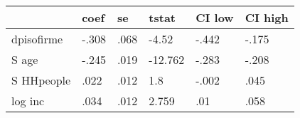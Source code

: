 \begin{table}[htbp]
\begin{tabular}{llllll} \hline \hline
 & coef  & se  & tstat  & CI low  & CI high  \\  \hline 
dpisofirme & -.308 & .068 & -4.52 & -.442 & -.175 \\  
S age & -.245 & .019 & -12.762 & -.283 & -.208 \\  
S HHpeople & .022 & .012 & 1.8 & -.002 & .045 \\  
log inc & .034 & .012 & 2.759 & .01 & .058 \\  
\hline \hline \end{tabular}
\end{table}
